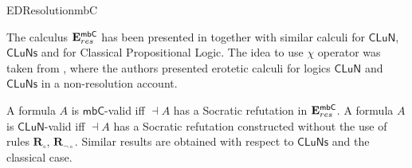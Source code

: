 \begin{entry}{EDResolutionmbC}
\begin{history}
The calculus $\mathbf{E}^\mathsf{mbC}_{res}$ has been presented in \cite{SzChDLJ:LFI} together with similar calculi for $\mathsf{CLuN}$, $\mathsf{CLuNs}$ and for Classical Propositional Logic. The idea to use $\chi$ operator was taken from \cite{WVL:2005}, where the authors presented erotetic calculi for logics $\mathsf{CLuN}$ and $\mathsf{CLuNs}$ in a non-resolution account.
\end{history}

\begin{technicalities}
A formula $A$ is $\mathsf{mbC}$-valid iff $\dashv A$ has a Socratic refutation in $\mathbf{E}^\mathsf{mbC}_{res}$. A formula $A$ is $\mathsf{CLuN}$-valid iff $\dashv A$ has a Socratic refutation constructed without the use of rules $\mathbf{R}_\circ$, $\mathbf{R}_{\lnot \circ}$. Similar results are obtained with respect to $\mathsf{CLuNs}$ and the classical case.
\end{technicalities}



%
%
%
%
%
%
% 
%












\end{entry}

